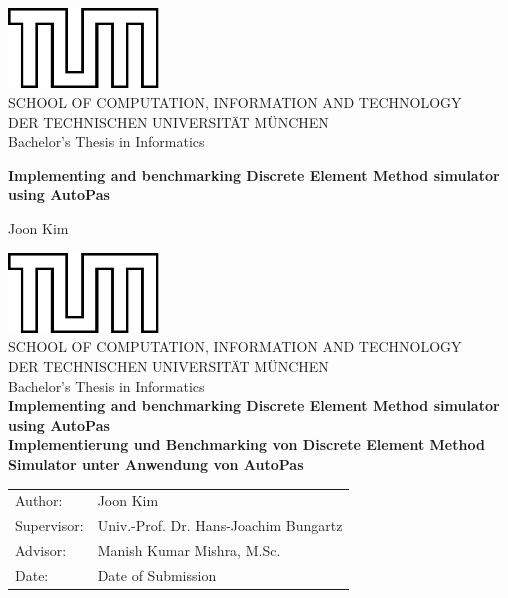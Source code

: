 \documentclass[11pt,
               a4paper,
               bibtotoc,
               idxtotoc,
               headsepline,
               footsepline,
               footexclude,
               BCOR12mm,
               DIV13,
               openany,   %
               ]
               {scrbook}
\def\doctype{Bachelor's Thesis\xspace}
\def\studyProgram{Informatics}
\def\title{Implementing and benchmarking Discrete Element Method simulator using AutoPas}
\def\titleGer{Implementierung und Benchmarking von Discrete Element Method Simulator unter Anwendung von AutoPas}
\def\author{Joon Kim}
\def\supervisor{Univ.-Prof. Dr. Hans-Joachim Bungartz}
\def\advisor{Manish Kumar Mishra, M.Sc.}
\def\date{Date of Submission}
\begin{document}
\frontmatter

\def\bcorcor{0.15cm}
\addtolength{\hoffset}{\bcorcor}
\thispagestyle{empty}
\vspace{4cm}
\begin{center}
    \includegraphics[width=4cm]{templateStuff/tumlogo.pdf}\\[5mm]
    \huge SCHOOL OF COMPUTATION, INFORMATION AND TECHNOLOGY\\[5mm]
    \large DER TECHNISCHEN UNIVERSITÄT MÜNCHEN\\[24mm]

    {\Large \doctype in \studyProgram}\\[20mm]
    {\huge\bf \title\par}
    \vspace{15mm}
    {\LARGE  \author}
\end{center}

\cleardoubleemptypage


\def\bcorcor{0.15cm}
\addtolength{\hoffset}{\bcorcor}
\thispagestyle{empty}
\vspace{10mm}
\begin{center}
    \includegraphics[width=4cm]{templateStuff/tumlogo.pdf}\\[5mm]
	\huge SCHOOL OF COMPUTATION, INFORMATION AND TECHNOLOGY\\[5mm]
	\large DER TECHNISCHEN UNIVERSITÄT MÜNCHEN\\[24mm]
	{\Large \doctype in \studyProgram}\\[20mm]
	{\LARGE\bf \title}\\[10mm]
	{\LARGE\bf \titleGer}\\[10mm]
	\begin{tabular}{ll}
		\Large Author:      	& \Large \author \\[2mm]
		\Large Supervisor:  	& \Large \supervisor\\[2mm]
		\Large Advisor:			& \Large \advisor\\[2mm]
		\Large Date:       		& \Large \date
	\end{tabular}
\end{center}
\end{document}
